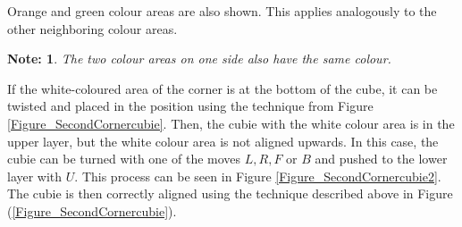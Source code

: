 \documentclass[12pt,a4paper]{article}
\theoremstyle{custom}
\newtheorem*{note}{Note:}
\begin{document}
Orange and green colour areas are also shown.
This applies analogously to the other neighboring colour areas. 
\begin{note}
    The two colour areas on one side also have the same colour.
\end{note}
 If the white-coloured area of the corner is at the bottom of the cube, it can be twisted and placed in the position using the technique from Figure \ref{Figure_SecondCornercubie}. Then, the cubie with the white colour area is in the upper layer, but the white colour area is not aligned upwards. In this case, the cubie can be turned with one of the moves $L, R, F$ or $B$ and pushed to the lower layer with $U$. This process can be seen in Figure \ref{Figure_SecondCornercubie2}. The cubie is then correctly aligned using the technique described above in Figure (\ref{Figure_SecondCornercubie}).
\end{document}
